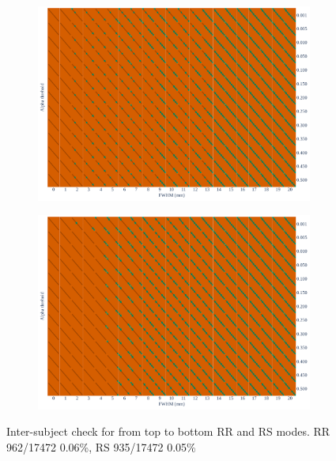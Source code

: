 \documentclass{article}
\begin{document}
\begin{figure}
    \centering
    \begin{subfigure}[t]{0.7\linewidth}
        \includegraphics[width=\linewidth]{figures/inter-subject/one_mct_fwe_bonferroni_RR.pdf}
    \end{subfigure}
    \begin{subfigure}[t]{0.7\linewidth}
        \includegraphics[width=\linewidth]{figures/inter-subject/one_mct_fwe_bonferroni_RS.pdf}
    \end{subfigure}
    \caption{Inter-subject check for from top to bottom RR and RS modes. RR 962/17472 0.06\%, RS 935/17472 0.05\%}
    \label{fig:ieee-check}
\end{figure}
\end{document}
